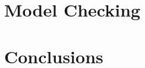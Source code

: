 \section{Model Checking}
\label{sec:Model_Checking}





\section{Conclusions}
\label{sec:Conclusions}





